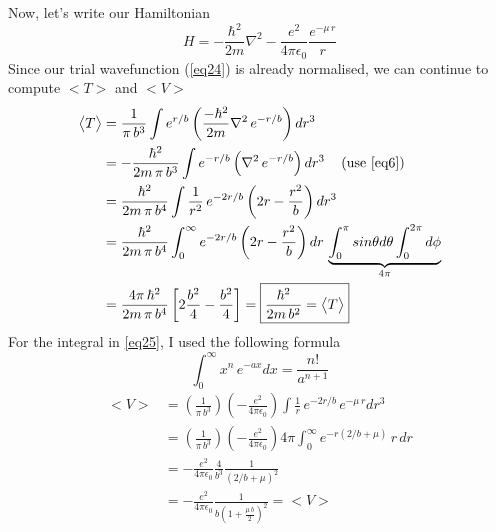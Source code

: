 \documentclass[12 pt]{article}
\numberwithin{equation}{section}
\begin{document}
Now, let's write our Hamiltonian 
\begin{equation}\label{eq24}
  H = -\frac{\hbar^2}{2m}\nabla^2 - \frac{e^2}{4\pi\epsilon_0}\frac{e^{-\mu\,r}}{r}
\end{equation}
Since our trial wavefunction (\autoref{eq24}) is already normalised,
we can continue to compute $\big<T\big>$ 
and $\big<V\big>$
\begin{equation}\label{eq25}
\begin{aligned}
  \big<T\big> &= \frac{1}{\pi\,b^3}\int e^{r/b} \left(\frac{-\hbar^2}{2m}\nabla^2\,e^{-r/b}\right)
  dr^3\\
              &= -\frac{\hbar^2}{2m\,\pi\,b^3}\int e^{-r/b}\left(\nabla^2\,e^{-r/b}\right)
             dr^3 \,\quad \text{(use \autoref{eq6})}\\
              &= \frac{\hbar^2}{2m\,\pi\,b^4}\int \frac{1}{r^2}\,e^{-2r/b}\left(
              2r-\frac{r^2}{b}\right)dr^3\\
              &=\frac{\hbar^2}{2m\,\pi\,b^4}\int_{0}^{\infty}e^{-2r/b}\left(
              2r-\frac{r^2}{b}\right)dr\,\underbrace{\int_{0}^{\pi} sin\theta d\theta 
    \int_{0}^{2\pi}d\phi}_{4\pi}\\
              &=\frac{4\pi\,\hbar^2}{2m\,\pi\,b^4} \left[2\frac{b^2}{4} -
              \frac{b^2}{4}\right] = \boxed{\frac{\hbar^2}{2m\,b^2} = \big<T\big>}
\end{aligned}
\end{equation}
For the integral in \autoref{eq25}, I used the following formula
\begin{equation}\label{eq26}
  \int_{0}^{\infty} x^n\,e^{-ax}dx = \frac{n!}{a^{n+1}}
\end{equation}
\begin{equation}\label{eq27}
\begin{aligned}
  \big<V\big> &= \left(\frac{1}{\pi\,b^3}\right)\left(-\frac{e^2}{4\pi\epsilon_0}\right)
  \int\frac{1}{r}\,e^{-2r/b}\,e^{-\mu\,r}dr^3\\
              &=\left(\frac{1}{\pi\,b^3}\right)\left(-\frac{e^2}{4\pi\epsilon_0}\right)4\pi
              \int_{0}^{\infty} e^{-r\left(2/b + \mu\right)}\,r\,dr\\
              &= -\frac{e^2}{4\pi\epsilon_0}\frac{4}{b^3}\frac{1}{(2/b+\mu)^2}\\
              &= \boxed{-\frac{e^2}{4\pi\epsilon_0}\frac{1}{b\left(1+\frac{\mu\,b}{2}\right)^2}
              = \big<V\big>}
\end{aligned}
\end{equation}
\end{document}
